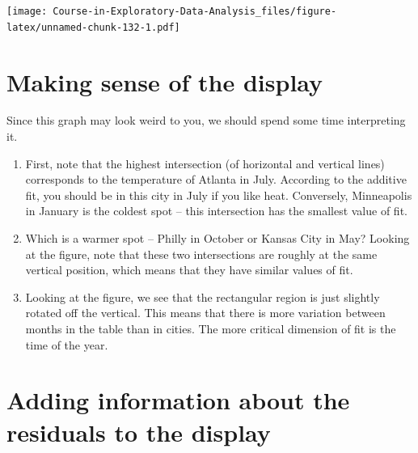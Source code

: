 \documentclass[
]{book}
\newenvironment{Shaded}{\begin{snugshade}}{\end{snugshade}}
\newcommand{\DecValTok}[1]{\textcolor[rgb]{0.00,0.00,0.81}{#1}}
\newcommand{\FunctionTok}[1]{\textcolor[rgb]{0.00,0.00,0.00}{#1}}
\newcommand{\NormalTok}[1]{#1}
\newcommand{\OtherTok}[1]{\textcolor[rgb]{0.56,0.35,0.01}{#1}}
\newcommand{\SpecialCharTok}[1]{\textcolor[rgb]{0.00,0.00,0.00}{#1}}
\begin{document}
\begin{Shaded}
\end{Shaded}

\texttt{[image: Course-in-Exploratory-Data-Analysis\_files/figure-latex/unnamed-chunk-132-1.pdf]}

\hypertarget{making-sense-of-the-display}{%
\section{Making sense of the display}\label{making-sense-of-the-display}}

Since this graph may look weird to you, we should spend some time interpreting it.

\begin{enumerate}
\def\labelenumi{\arabic{enumi}.}
\item
  First, note that the highest intersection (of horizontal and vertical lines) corresponds to the temperature of Atlanta in July. According to the additive fit, you should be in this city in July if you like heat. Conversely, Minneapolis in January is the coldest spot -- this intersection has the smallest value of fit.
\item
  Which is a warmer spot -- Philly in October or Kansas City in May? Looking at the figure, note that these two intersections are roughly at the same vertical position, which means that they have similar values of fit.
\item
  Looking at the figure, we see that the rectangular region is just slightly rotated off the vertical. This means that there is more variation between months in the table than in cities. The more critical dimension of fit is the time of the year.
\end{enumerate}

\hypertarget{adding-information-about-the-residuals-to-the-display}{%
\section{Adding information about the residuals to the display}\label{adding-information-about-the-residuals-to-the-display}}
\end{document}
